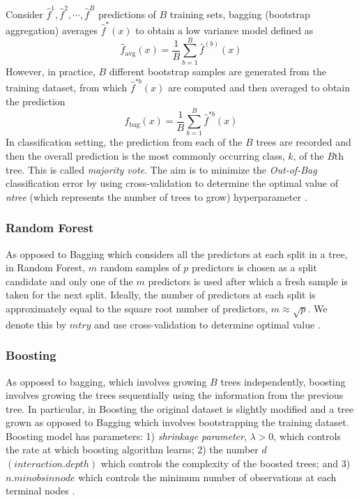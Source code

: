 Consider $\hat{f}^1, \hat{f}^2, \cdots, \hat{f}^B$ predictions of $B$ training sets, bagging (bootstrap aggregation) averages $\hat{f}^*(x)$ to obtain a low variance model defined as
\[
\hat{f}_{\text{avg}}(x) = \frac{1}{B}\sum^{B}_{b=1}{\hat{f}^{(b)}(x)}
\]
However, in practice, $B$ different bootstrap samples are generated from the training dataset, from which $\hat{f}^{*b}(x)$ are computed and then averaged to obtain the prediction 
\[
\hat{f}_{\text{bag}}(x) = \frac{1}{B}\sum^{B}_{b=1}{\hat{f}^{*b}(x)}
\]
In classification setting, the prediction from each of the $B$ trees are recorded and then the overall prediction is the most commonly occurring class, $k$, of the $B$th tree. This is called \textit{majority vote}. The aim is to minimize the \textit{Out-of-Bag} classification error by using cross-validation to determine  the optimal value of \textit{ntree} (which represents the number of trees to grow) hyperparameter \citep{james2013introduction}.

\subsubsection{Random Forest}

As opposed to Bagging which considers all the predictors at each split in a tree, in Random Forest, $m$ random samples of $p$ predictors is chosen as a split candidate and only one of the $m$ predictors is used after which a fresh sample is taken for the next split. Ideally, the number of predictors at each split is approximately equal to the square root number of predictors, $m\approx\sqrt{p}$. We denote this by $mtry$ and use cross-validation to determine optimal value \citep{james2013introduction}. 

\subsubsection{Boosting}


As opposed to bagging, which involves growing $B$ trees independently, boosting involves growing the trees sequentially using the information from the previous tree. In particular, in Boosting the original dataset is slightly modified and a tree grown as opposed to Bagging which involves bootstrapping the training dataset. Boosting model has parameters: 1) \textit{shrinkage parameter}, $\lambda>0$, which controls the rate at which boosting algorithm learns; 2) the number $d$ $(interaction.depth)$ which controls the complexity of the boosted trees; and 3) $n.minobsinnode$ which controls the minimum number of observations at each terminal nodes \citep{james2013introduction}.


